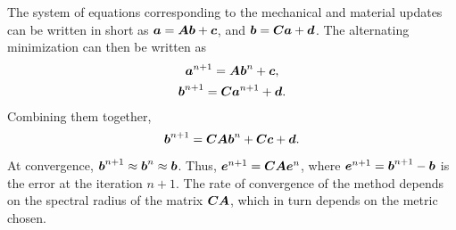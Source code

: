 \documentclass[12pt]{elsarticle}
\begin{document}
The system of equations corresponding to the mechanical and material updates can be written in short as $\bfa = \bfA \bfb + \bfc$, and $\bfb = \bfC \bfa + \bfd$. The alternating minimization can then be written as
\begin{gather}
	\bfa^{n+1} = \bfA \bfb^{n} + \bfc, \\
	\bfb^{n+1} = \bfC \bfa^{n+1} + \bfd.
\end{gather}
Combining them together, 
\begin{equation}
	\bfb^{n+1} = \bfC \bfA \bfb^{n} +\bfC \bfc + \bfd. \label{combined_equn}
\end{equation}
At convergence, $\bfb^{n+1} \approx \bfb^{n} \approx \bfb$. Thus, $\bfe^{n+1} = \bfC \bfA \bfe^{n}$, where $\bfe^{n+1} = \bfb^{n+1} - \bfb$ is the error at the iteration $n+1$. The rate of convergence of the method depends on the spectral radius of the matrix $\bfC \bfA$, which in turn depends on the metric chosen. 
\end{document}
